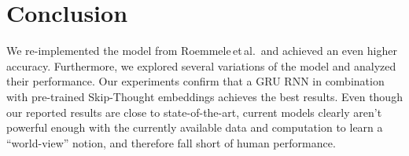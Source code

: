 \documentclass{article}
\begin{document}
\section{Conclusion}\label{sec:conclusion}
We re-implemented the model from Roemmele\,et\,al.\,\citep{Roemmele2017AnTest} and achieved an even higher accuracy. Furthermore, we explored several variations of the model and analyzed their performance. Our experiments confirm that a GRU RNN in combination with pre-trained Skip-Thought embeddings achieves the best results. Even though our reported results are close to state-of-the-art, current models clearly aren't powerful enough with the currently available data and computation to learn a ``world-view'' notion, and therefore fall short of human performance.


\end{document}
